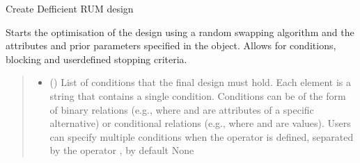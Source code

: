 \documentclass[a4paper,10pt,english]{sphinxhowto}
\begin{document}
\begin{fulllineitems}
\begin{fulllineitems}
\label{\detokenize{generated/choicedesign.design:choicedesign.design.RUMDesign.optimise}}
\pysigstartsignatures
{}
\pysigstopsignatures
\sphinxAtStartPar
Create D\sphinxhyphen{}efficient RUM design

\sphinxAtStartPar
Starts the optimisation of the design using a random swapping
algorithm and the attributes and prior parameters specified in
the  object. Allows for conditions, blocking and
user\sphinxhyphen{}defined stopping criteria.
\begin{quote}\begin{description}
\begin{itemize}
\item {} 
\sphinxAtStartPar
{} (\sphinxstyleliteralemphasis{\sphinxupquote{{[}}}\sphinxstyleliteralemphasis{\sphinxupquote{{]}}}\sphinxstyleliteralemphasis{\sphinxupquote{, }}) \textendash{} List of conditions that the final design must hold. Each element
is a string that contains a single condition. Conditions
can be of the form of binary relations (e.g.,  where 
and  are attributes of a specific alternative) or conditional
relations (e.g.,  where  and  are values).
Users can specify multiple conditions when the operator  is defined,
separated by the operator \sphinxtitleref{\&}, by default None


\end{itemize}
\end{description}
\end{quote}
\end{fulllineitems}
\end{fulllineitems}
\end{document}
